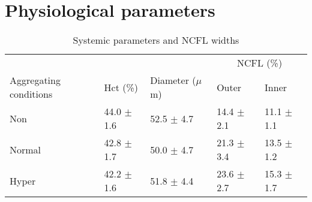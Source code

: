 \newpage
\section{Physiological parameters}
\begin{table}[ht]
  \caption{Systemic parameters and NCFL widths \cite{Ng2015}}
  \label{tab:tab1}
  \begin{tabular}{lllll}\hline
    & & & \multicolumn{2}{c}{NCFL (\%)} \\ \cline{4-5}
    Aggregating conditions & Hct (\%) & Diameter ($\mu$m) & Outer & Inner \\
    \hline
    Non & 44.0 $\pm$ 1.6 & 52.5 $\pm$ 4.7 & 14.4 $\pm$ 2.1 & 11.1 $\pm$ 1.1 \\
    Normal & 42.8 $\pm$ 1.7 & 50.0 $\pm$ 4.7 & 21.3 $\pm$ 3.4 & 13.5 $\pm$ 1.2 
    \\
    Hyper & 42.2 $\pm$ 1.6 & 51.8 $\pm$ 4.4 & 23.6 $\pm$ 2.7 & 15.3 $\pm$ 1.7 \\
    \hline
  \end{tabular}
\end{table}